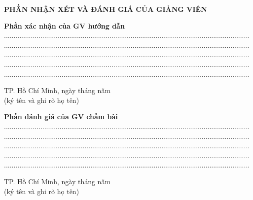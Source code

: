 \documentclass{article}
\begin{document}
	\begin{center}
		\fontsize{16}{20}\selectfont
		\textbf{PHẦN NHẬN XÉT VÀ ĐÁNH GIÁ CỦA GIẢNG VIÊN}\\
	\end{center}
	\fontsize{13}{13}\selectfont
	\textbf{Phần xác nhận của GV hướng dẫn}\\
	................................................................................................................................\\
	................................................................................................................................\\
	................................................................................................................................\\
	................................................................................................................................\\
	................................................................................................................................\\
	\begin{flushright}
		TP. Hồ Chí Minh,  ngày   tháng   năm   \\ 
		(ký tên và ghi rõ họ tên)\\
		\vspace{3cm}
	\end{flushright}
	\setstretch{1.5}
	\fontsize{13}{13}\selectfont
	\textbf{Phần đánh giá của GV chấm bài}\\
	................................................................................................................................\\
	................................................................................................................................\\
	................................................................................................................................\\
	................................................................................................................................\\
	................................................................................................................................\\
	\begin{flushright}
		TP. Hồ Chí Minh,  ngày   tháng   năm   \\ 
		(ký tên và ghi rõ họ tên)\\
		\vspace{3cm}
	\end{flushright}
	\pagebreak
	
\end{document}
